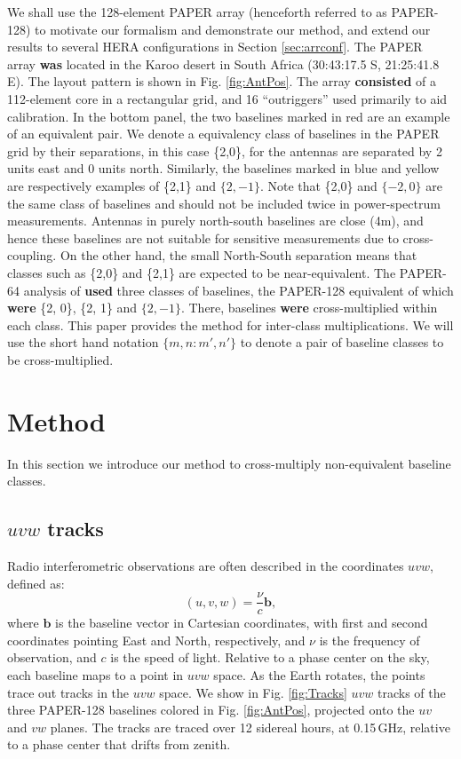 \documentclass[twocolumn,apj,numberedappendix]{emulateapj}
\renewcommand\[{\begin{equation}}
\renewcommand\]{\end{equation}}
\begin{document}
We shall use the 128-element PAPER array (henceforth referred to as PAPER-128) to motivate our formalism and demonstrate our method, and extend our results to several HERA configurations in Section \ref{sec:arrconf}. 
The PAPER array \textbf{was} located in the Karoo desert in South Africa (30:43:17.5
S, 21:25:41.8 E). The layout pattern is shown
in Fig. \ref{fig:AntPos}. The array \textbf{consisted} of a 112-element core in a rectangular grid, and 16 ``outriggers'' used primarily to aid calibration.  In the bottom panel, the two baselines marked in red are an example of an equivalent pair. We denote a equivalency class of baselines in the PAPER grid by their separations, in this case  \{2,0\}, for the
antennas are separated by 2 units east and 0 units north. Similarly,
the baselines marked in blue and yellow are respectively examples
of \{2,1\} and $\{2, -1\}$.
Note that \{2,0\} and $\{-2, 0\}$ are the same class of baselines and should not be included twice in power-spectrum measurements. Antennas in purely north-south baselines
are close (4m), and hence these baselines are not suitable
for sensitive measurements due to cross-coupling. On the other hand, the small North-South separation means that classes such as \{2,0\} and  \{2,1\} are expected to be near-equivalent. The PAPER-64 analysis of \cite{Ali2015} \textbf{used} three classes of baselines, the PAPER-128
equivalent of which \textbf{were} 
\{2, 0\}, \{2, 1\} and $\{2, -1\}$. There, baselines \textbf{were} cross-multiplied within each class. This paper provides the method for inter-class multiplications. We will use the short hand notation $\{m,n:m',n'\}$ to denote a pair of baseline classes to be cross-multiplied. 


\section{Method \label{sec:method}}\label{sec:method}

In this section we introduce our method to cross-multiply non-equivalent baseline classes. 

\subsection{$uvw$ tracks \label{sec:tracks}}


Radio interferometric observations are often described in the coordinates $uvw$, defined as:
\[
(u, v, w) = \frac{\nu}{c}\boldsymbol{b}, 
\]
where $\boldsymbol{b}$ is the baseline vector in Cartesian coordinates, with first and second coordinates pointing East and North, respectively, and  $\nu$ is the frequency of observation, and $c$ is the speed of light. 
Relative to a phase center on the sky, each baseline maps to a point in $uvw$ space. As the Earth rotates, the points trace out tracks in the $uvw$ space. 
We show in Fig. \ref{fig:Tracks} $uvw$ tracks of the three PAPER-128 baselines colored in Fig. \ref{fig:AntPos}, projected onto the $uv$ and $vw$ planes. The tracks are traced over 12 sidereal hours, at 0.15\,GHz, relative to a phase center that drifts from zenith. 
\end{document}
